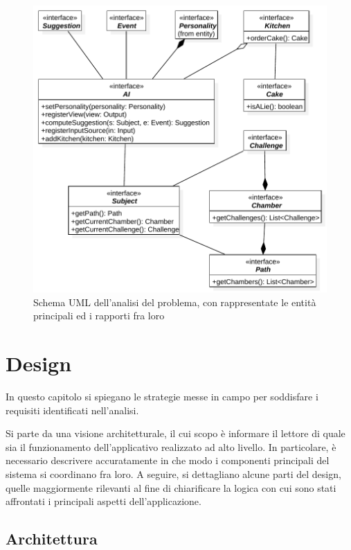 \documentclass[a4paper,12pt]{report}
\begin{document}
\begin{figure}[H]
\centering{}
\includegraphics{img/analysis.pdf}
\caption{Schema UML dell'analisi del problema, con rappresentate le entità principali ed i rapporti fra loro}
\label{img:analysis}
\end{figure}

\chapter{Design}

In questo capitolo si spiegano le strategie messe in campo per soddisfare i requisiti identificati nell'analisi.

Si parte da una visione architetturale, il cui scopo è informare il lettore di quale sia il funzionamento dell'applicativo realizzato ad alto livello.
%
In particolare, è necessario descrivere accuratamente in che modo i componenti principali del sistema si coordinano fra loro.
%
A seguire, si dettagliano alcune parti del design, quelle maggiormente rilevanti al fine di chiarificare la logica con cui sono stati affrontati i principali aspetti dell'applicazione.

\section{Architettura}
\end{document}
